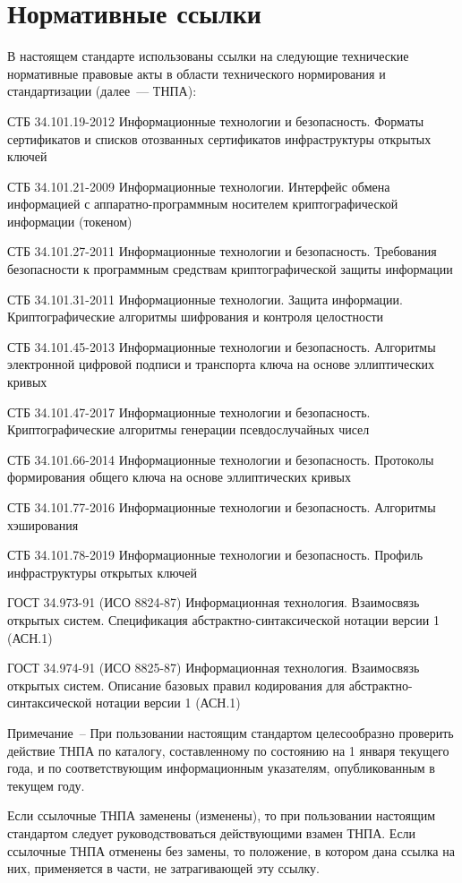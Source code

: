 \chapter{Нормативные ссылки}

В настоящем стандарте использованы ссылки на следующие технические 
нормативные правовые акты в области технического нормирования и 
стандартизации (далее~--- ТНПА): 

СТБ 34.101.19-2012 Информационные технологии и безопасность. Форматы 
сертификатов и списков отозванных сертификатов инфраструктуры открытых 
ключей 

СТБ 34.101.21-2009 Информационные технологии. Интерфейс обмена информацией
с аппаратно-программным носителем криптографической информации (токеном)

СТБ 34.101.27-2011 Информационные технологии и безопасность. Требования 
безопасности к программным средствам криптографической защиты информации 

СТБ 34.101.31-2011 Информационные технологии. Защита информации. 
Криптографические алгоритмы шифрования и контроля целостности 

СТБ 34.101.45-2013 Информационные технологии и безопасность. 
Алгоритмы электронной цифровой подписи и транспорта 
ключа на основе эллиптических кривых 

СТБ 34.101.47-2017 Информационные технологии и безопасность. 
Криптографические алгоритмы генерации псевдослучайных чисел 

СТБ 34.101.66-2014 Информационные технологии и безопасность. Протоколы 
формирования общего ключа на основе эллиптических кривых 

СТБ 34.101.77-2016 Информационные технологии и безопасность. 
Алгоритмы хэширования

СТБ 34.101.78-2019 Информационные технологии и безопасность. 
Профиль инфраструктуры открытых ключей

ГОСТ 34.973-91 (ИСО 8824-87) Информационная технология. Взаимосвязь 
открытых систем. Спецификация абстрактно-синтаксической нотации версии 1 
(АСН.1) 

ГОСТ 34.974-91 (ИСО 8825-87) Информационная технология. Взаимосвязь 
открытых систем. Описание базовых правил кодирования для 
абстрактно-синтаксической нотации версии 1 (АСН.1) 

\vskip6pt

\begin{note}
Примечание~-- 
При пользовании настоящим стандартом целесообразно проверить действие 
ТНПА по каталогу, составленному по состоянию на 1 января текущего года, 
и по соответствующим информационным указателям, опубликованным в текущем году.

Если ссылочные ТНПА заменены (изменены), то при пользовании настоящим
стандартом следует руководствоваться действующими взамен ТНПА.
Если ссылочные ТНПА отменены без замены, то положение, в котором дана ссылка
на них, применяется в части, не затрагивающей эту ссылку.
\end{note}
